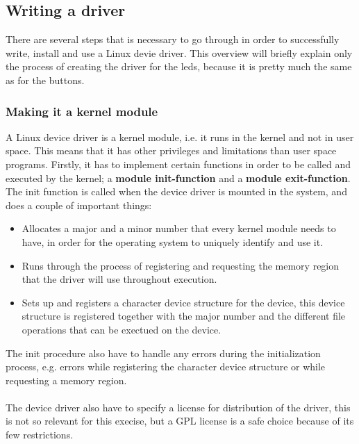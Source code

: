 \subsection{Writing a driver}
There are several steps that is necessary to go through in order
to successfully write, install and use a Linux devie driver. This 
overview will briefly explain only the process of creating the driver
for the leds, because it is pretty much the same as for the buttons.

\subsubsection{Making it a kernel module}
A Linux device driver is a kernel module, i.e. it runs in the kernel and
not in user space. This means that it has other privileges and 
limitations than user space programs. Firstly, it has to implement 
certain functions in order to be called and executed by the kernel;
a \textbf{module init-function} and a \textbf{module exit-function}.
The init function is called when the device driver is mounted in the
system, and does a couple of important things:

\begin{itemize}
	\item 	Allocates a major and a minor number that every 
			kernel module needs to have, in order for the 
			operating system to uniquely identify and use it.
	\item 	Runs through the process of registering and 
			requesting the memory region
			that the driver will use throughout execution.
	\item 	Sets up and registers a character device structure 
			for the device, this device structure is registered 
			together with the major number and the different 
			file operations that can be exectued on the device.
\end{itemize}
The init procedure also have to handle any errors during the 
initialization process, e.g. errors while registering the 
character device structure or while requesting a memory region.\\
\\
The device driver also have to specify a license for distribution of
the driver, this is not so relevant for this execise, but a GPL license
is a safe choice because of its few restrictions.

